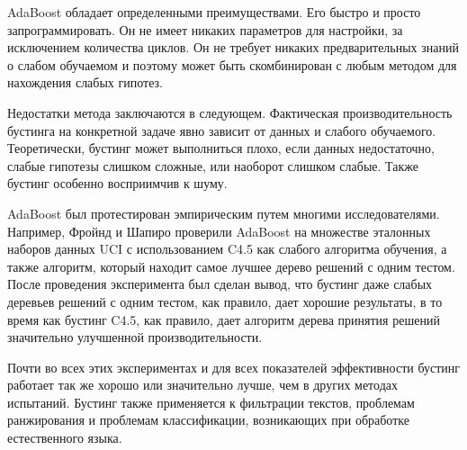 AdaBoost обладает определенными преимуществами. Его быстро и просто запрограммировать. Он не имеет никаких параметров для настройки, за исключением количества циклов. Он не требует никаких предварительных знаний о слабом обучаемом и поэтому может быть скомбинирован с любым методом для нахождения слабых гипотез.

Недостатки метода заключаются в следующем. Фактическая производительность бустинга на конкретной задаче явно зависит от данных и слабого обучаемого. Теоретически, бустинг может выполниться плохо, если данных недостаточно, слабые гипотезы слишком сложные, или наоборот слишком слабые. Также бустинг особенно восприимчив к шуму.

AdaBoost был протестирован эмпирическим путем многими исследователями. Например, Фройнд и Шапиро проверили AdaBoost на множестве эталонных наборов данных UCI \cite{Merz 1998} с использованием C4.5 \cite{Quinlan 1993} как слабого алгоритма обучения, а также алгоритм, который находит самое лучшее дерево решений с одним тестом. После проведения эксперимента был сделан вывод, что бустинг даже слабых деревьев решений с одним тестом, как правило, дает хорошие результаты, в то время как бустинг C4.5, как правило, дает алгоритм дерева принятия решений значительно улучшенной производительности.

Почти во всех этих экспериментах и для всех показателей эффективности бустинг работает так же хорошо или значительно лучше, чем в других методах испытаний. Бустинг также применяется к фильтрации текстов, проблемам ранжирования и проблемам классификации, возникающих при обработке естественного языка.

